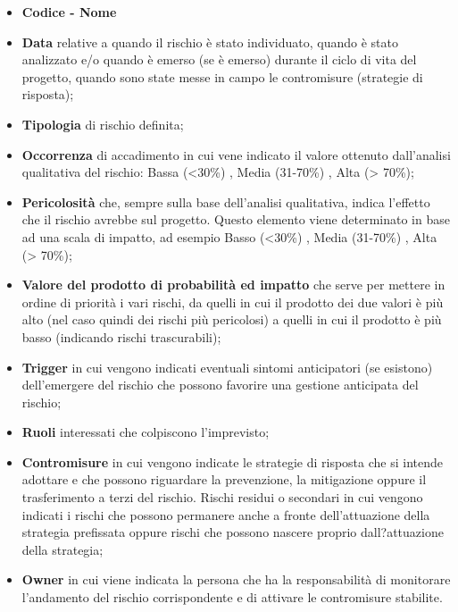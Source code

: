 \documentclass[12pt,a4paper,titlepage]{article}
\begin{document}
		\begin{itemize}	
			\item \textbf{Codice - Nome}
			\item \textbf{Data} relative a quando il rischio è stato individuato, quando è stato analizzato e/o quando è emerso (se è emerso) durante il ciclo di vita del progetto, quando sono state messe in campo le contromisure (strategie di risposta);
			\item \textbf{Tipologia} di rischio definita;
			\item \textbf{Occorrenza} di accadimento in cui vene indicato il valore ottenuto dall'analisi qualitativa del rischio: Bassa (<30\%) , Media (31-70\%) , Alta (> 70\%);
			\item \textbf{Pericolosità} che, sempre sulla base dell'analisi qualitativa, indica l'effetto che il rischio avrebbe sul progetto. Questo elemento viene determinato in base ad una scala di impatto, ad esempio Basso (<30\%) , Media (31-70\%) , Alta (> 70\%);
			\item \textbf{Valore del prodotto di probabilità ed impatto} che serve per mettere in ordine di priorità i vari rischi, da quelli in cui il prodotto dei due valori è più alto (nel caso quindi dei rischi più pericolosi) a quelli in cui il prodotto è più basso (indicando rischi trascurabili);
			\item \textbf{Trigger} in cui vengono indicati eventuali sintomi anticipatori (se esistono) dell'emergere del rischio che possono favorire una gestione anticipata del rischio;
			\item \textbf{Ruoli} interessati che colpiscono l'imprevisto;
			\item \textbf{Contromisure} in cui vengono indicate le strategie di risposta che si intende adottare e che possono riguardare la prevenzione, la mitigazione oppure il trasferimento a terzi del rischio.
			Rischi residui o secondari in cui vengono indicati i rischi che possono permanere anche a fronte dell'attuazione della strategia prefissata oppure rischi che possono nascere proprio dall?attuazione della strategia;
			\item \textbf{Owner} in cui viene indicata la persona che ha la responsabilità di monitorare l'andamento del rischio corrispondente e di attivare le contromisure stabilite.
		\end{itemize}
	
\end{document}
